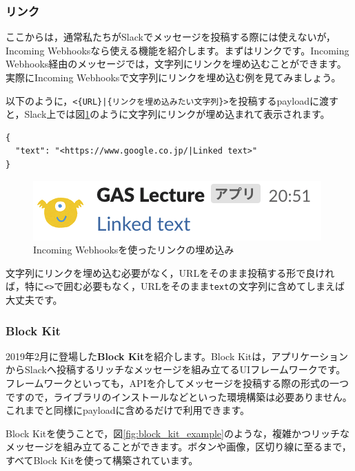 \documentclass[uplatex,a4j]{jsarticle}
\begin{document}
\subsubsection{リンク}


ここからは，通常私たちがSlackでメッセージを投稿する際には使えないが，Incoming Webhooksなら使える機能を紹介します。まずはリンクです。Incoming Webhooks経由のメッセージでは，文字列にリンクを埋め込むことができます。実際にIncoming Webhooksで文字列にリンクを埋め込む例を見てみましょう。


以下のように，\verb+<{URL}|{リンクを埋め込みたい文字列}>+を投稿するpayloadに渡すと，Slack上では図\ref{fig:linked_text_sample}のように文字列にリンクが埋め込まれて表示されます。

\begin{lstlisting}[basicstyle=\ttfamily\footnotesize,frame=single,caption=Link payload sample,label=linkpayload]
{
  "text": "<https://www.google.co.jp/|Linked text>"
}
\end{lstlisting}

\begin{figure}[H]
 \centering
 \includegraphics[keepaspectratio, scale=0.8]{images/linked_text_sample.png}
 \caption{Incoming Webhooksを使ったリンクの埋め込み}
 \label{fig:linked_text_sample}
\end{figure}

文字列にリンクを埋め込む必要がなく，URLをそのまま投稿する形で良ければ，特に\verb|<>|で囲む必要もなく，URLをそのまま\verb|text|の文字列に含めてしまえば大丈夫です。

\subsubsection{Block Kit}

2019年2月に登場した\textbf{Block Kit}を紹介します。Block Kitは，アプリケーションからSlackへ投稿するリッチなメッセージを組み立てるUIフレームワークです。フレームワークといっても，APIを介してメッセージを投稿する際の形式の一つですので，ライブラリのインストールなどといった環境構築は必要ありません。これまでと同様にpayloadに含めるだけで利用できます。

Block Kitを使うことで，図\ref{fig:block_kit_example}のような，複雑かつリッチなメッセージを組み立てることができます。ボタンや画像，区切り線に至るまで，すべてBlock Kitを使って構築されています。
\end{document}
